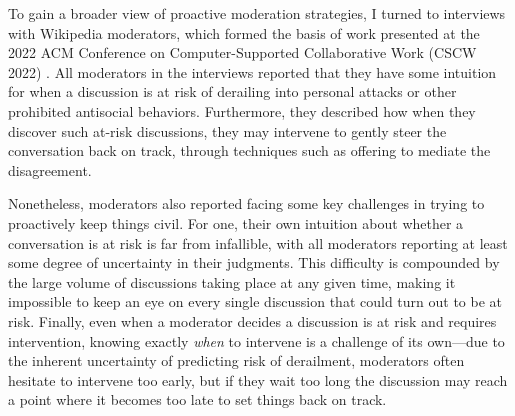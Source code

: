 \documentclass[11pt,letterpaper]{article}
\begin{document}

To gain a broader view of proactive moderation strategies, I turned to interviews with Wikipedia moderators, which formed the basis of work presented at the 2022 ACM Conference on Computer-Supported Collaborative Work (CSCW 2022) \cite{schluger_proactive_2022}.
All moderators in the interviews reported that they have some intuition for when a discussion is at risk of derailing into personal attacks or other prohibited antisocial behaviors.
Furthermore, they described how when they discover such at-risk discussions, they may intervene to gently steer the conversation back on track, through techniques such as offering to mediate the disagreement.

Nonetheless, moderators also reported facing some key challenges in trying to proactively keep things civil.
For one, their own intuition about whether a conversation is at risk is far from infallible, with all moderators reporting at least some degree of uncertainty in their judgments.
This difficulty is compounded by the large volume of discussions taking place at any given time, making it impossible to keep an eye on every single discussion that could turn out to be at risk.
Finally, even when a moderator decides a discussion is at risk and requires intervention, knowing exactly \emph{when} to intervene is a challenge of its own---due to the inherent uncertainty of predicting risk of derailment, moderators often hesitate to intervene too early, but if they wait too long the discussion may reach a point where it becomes too late to set things back on track.%
\end{document}
